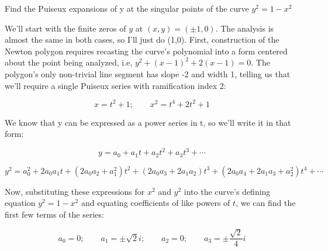 %
%
%
%
%
%
%

\example Find the Puiseux expansions of y at the singular points of the
curve $y^2 = 1 - x^2$

We'll start with the finite zeros of $y$ at $(x,y)=(\pm 1, 0)$.  The
analysis is almost the same in both cases, so I'll just do (1,0).
First, construction of the Newton polygon requires recasting the
curve's polynomial into a form centered about the point being
analyzed, i.e, $y^2 + (x-1)^2 + 2(x-1) = 0$.  The polygon's only
non-trivial line segment has slope -2 and width 1, telling us that
we'll require a single Puiseux series with ramification index 2:

$$x=t^2+1; \qquad x^2=t^4+2t^2+1$$

We know that y can be expressed as a power series in t, so we'll write
it in that form:

$$y=a_0 + a_1 t + a_2 t^2 + a_3 t^3 + \cdots$$

$$y^2 = a_0^2 + 2 a_0 a_1 t + (2 a_0 a_2 + a_1^2) t^2 + (2 a_0 a_3 + 2 a_1 a_2) t^3 + (2 a_0 a_4 + 2 a_1 a_3 + a_2^2) t^4 + \cdots$$

Now, substituting these expressions for $x^2$ and $y^2$ into the
curve's defining equation $y^2 = 1 - x^2$ and equating coefficients
of like powers of $t$, we can find the first few terms of the series:

$$a_0=0; \qquad a_1 = \pm\sqrt{2}i; \qquad a_2 = 0; \qquad a_3 = \pm \frac{\sqrt{2}}{4} i$$

